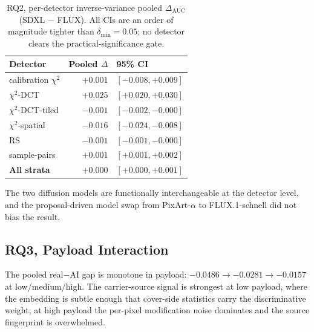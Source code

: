 \documentclass[10pt,twocolumn,a4paper]{article}
\begin{document}
\begin{table}[t]
\centering\small
\caption{RQ2, per-detector inverse-variance pooled $\Delta_\text{AUC}$ (SDXL $-$ FLUX). All CIs are an order of magnitude tighter than $\delta_\text{min}\!=\!0.05$; no detector clears the practical-significance gate.}
\label{tab:rq2meta}
\setlength{\tabcolsep}{5pt}\renewcommand{\arraystretch}{1.1}
\begin{tabular}{@{}l r l@{}}
\toprule
\textbf{Detector} & \textbf{Pooled $\Delta$} & \textbf{95\% CI} \\
\midrule
calibration $\chi^2$    & $+0.001$ & $[-0.008, +0.009]$ \\
$\chi^2$-DCT            & $+0.025$ & $[+0.020, +0.030]$ \\
$\chi^2$-DCT-tiled      & $-0.001$ & $[-0.002, -0.000]$ \\
$\chi^2$-spatial        & $-0.016$ & $[-0.024, -0.008]$ \\
RS                      & $-0.001$ & $[-0.001, -0.000]$ \\
sample-pairs            & $+0.001$ & $[+0.001, +0.002]$ \\
\midrule
\textbf{All strata}     & $\boldsymbol{+0.000}$ & $\boldsymbol{[+0.000, +0.001]}$ \\
\bottomrule
\end{tabular}
\end{table}

The two diffusion models are functionally interchangeable at the detector level, and the proposal-driven model swap from PixArt-$\alpha$ to FLUX.1-schnell did not bias the result.

\subsection{RQ3, Payload Interaction}

The pooled real$-$AI gap is monotone in payload: $-0.0486 \to -0.0281 \to -0.0157$ at low/medium/high. The carrier-source signal is strongest at low payload, where the embedding is subtle enough that cover-side statistics carry the discriminative weight; at high payload the per-pixel modification noise dominates and the source fingerprint is overwhelmed.
\end{document}
